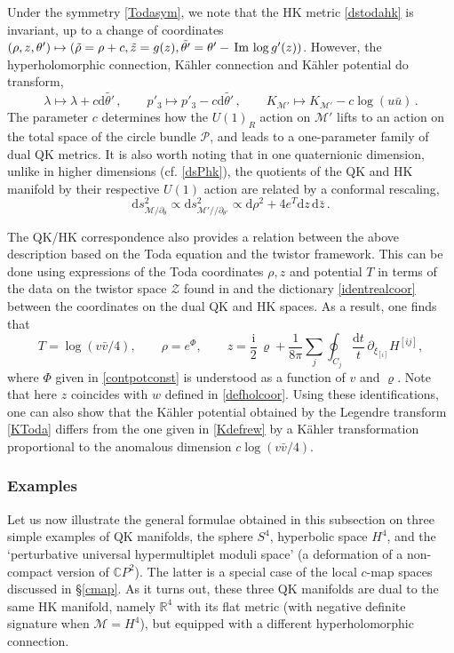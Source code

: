 \documentclass[12pt,reqno]{article}
\numberwithin{equation}{section}
\renewcommand{\Im}{\imag}
\DeclareMathOperator{\imag}{Im}
\newcommand{\be}{\begin{equation}}
\newcommand{\ee}{\end{equation}}
\def\Im{\,{\rm Im}\, }
\def\p{\partial}
\def\vrh{\varrho}
\def\bu{\bar u}
\def\bv{\bar v}
\newcommand{\de}{\mathrm{d}}
\newcommand{\I}{\mathrm{i}}
\def\vrh{\varrho}
\newcommand{\cM}{\mathcal{M}}
\newcommand{\cP}{\mathcal{P}}
\newcommand{\cZ}{\mathcal{Z}}
\newcommand{\IR}{\mathbb{R}}
\newcommand{\IC}{\mathbb{C}}
\def\Hij#1{H^{[#1]}}
\def\xii#1{\xi_{[#1]}}
\newcommand{\kahler}{{K\"ahler}\xspace}
\def\varpiqk{t}
\def\sigp{{\theta}}
\def\phip{{\theta'}}
\def\kcon{p'_3}
\def\pcM{\cM'}
\def\conhyper{\lambda}
\numberwithin{equation}{section}
\begin{document}
Under the symmetry \eqref{Todasym}, we note that the HK metric \eqref{dstodahk}
is invariant, up to a change of coordinates
$(\rho,z,\phip)\mapsto (\tilde\rho=\rho+c,\tilde z=g(z),\tilde\phip=\phip-\Im\log g'(z))$.
However, the hyperholomorphic connection, \kahler connection and
K\"ahler potential  do transform,
\be
\label{lambdac}
\conhyper \mapsto \conhyper +c \de\tilde\phip\, ,
\qquad
\kcon \mapsto  \kcon- c \de\tilde\phip\, ,
\qquad
K_{\pcM}\mapsto K_{\pcM}-c \log(u\bu)\, .
\ee
The parameter $c$ determines how the  $U(1)_R$ action
on $\pcM$ lifts to an action on the total space of the circle bundle $\cP$,
and leads to a one-parameter family of dual QK metrics.
It is also worth noting that in one quaternionic dimension, unlike in higher
dimensions (cf. \eqref{dsPhk}),
the quotients of the QK and HK manifold by their respective $U(1)$ action
are related by a conformal rescaling,
\be
\de s^2_{\cM/\partial_\sigp} \propto \de s^2_{\pcM//\partial_\phip} \propto \de\rho^2 +
4 e^T \de z\, \de \bar z\, .
\ee


The QK/HK correspondence also provides a relation between the above description
based on the Toda equation and the twistor framework.
This can be done using expressions of the Toda coordinates $\rho,z$ and potential
$T$ in terms of the data on the twistor space $\cZ$ found in \cite{Alexandrov:2009vj} and
the dictionary \eqref{identrealcoor}
between the coordinates on the dual QK and HK spaces.
As a result, one finds that
\be
T=\log(v\bv/4),
\qquad
\rho=e^\Phi,
\qquad
z=\frac{\I}{2}\,\vrh
+\frac{1}{8\pi}\sum_j\oint_{C_j}\frac{\de \varpiqk}{\varpiqk}\,\p_{\xii{i}}\Hij{ij},
\label{HKident}
\ee
where $\Phi$ given in \eqref{contpotconst} is understood as a function of $v$ and $\vrh$.
Note that here $z$ coincides with $w$ defined in \eqref{defholcoor}.
Using these identifications, one can also show that
the K\"ahler potential obtained by the Legendre transform \eqref{KToda}
differs from the one given in \eqref{Kdefrew} by a K\"ahler transformation
proportional to the anomalous dimension $c\log(v\bv/4)$.



\subsubsection{Examples\label{sec_todaex}}

Let us now illustrate the general formulae obtained in this subsection on three
simple examples of QK manifolds, the sphere $S^4$, hyperbolic space $H^4$,
and the `perturbative universal hypermultiplet moduli space' (a deformation of
a non-compact version of $\IC P^2$). The latter is a special case of the
local $c$-map spaces discussed in \S\ref{cmap}. As it turns out, these three
QK manifolds are dual to the same HK manifold, namely $\IR^4$ with its
flat metric (with negative definite signature when $\cM=H^4$), but equipped
with a different hyperholomorphic connection.
\end{document}
